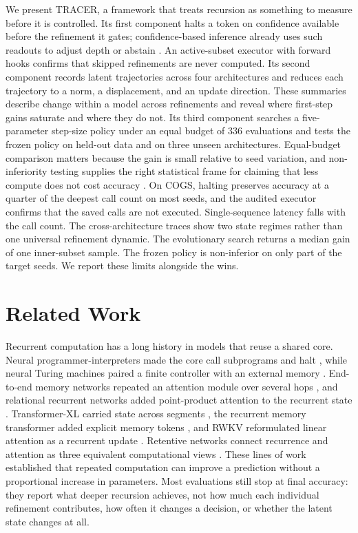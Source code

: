 \documentclass[11pt]{article}
\begin{document}
We present TRACER, a framework that treats recursion as something to measure before it is controlled. Its first component halts a token on confidence available before the refinement it gates; confidence-based inference already uses such readouts to adjust depth or abstain \citep{liu2020fastbert,xin2020deebert,geifman2017selective}. An active-subset executor with forward hooks confirms that skipped refinements are never computed. Its second component records latent trajectories across four architectures and reduces each trajectory to a norm, a displacement, and an update direction. These summaries describe change within a model across refinements and reveal where first-step gains saturate and where they do not. Its third component searches a five-parameter step-size policy under an equal budget of 336 evaluations and tests the frozen policy on held-out data and on three unseen architectures. Equal-budget comparison matters because the gain is small relative to seed variation, and non-inferiority testing supplies the right statistical frame for claiming that less compute does not cost accuracy \citep{docampobayon2025noninferiority,gu2023evaluation}. On COGS, halting preserves accuracy at a quarter of the deepest call count on most seeds, and the audited executor confirms that the saved calls are not executed. Single-sequence latency falls with the call count. The cross-architecture traces show two state regimes rather than one universal refinement dynamic. The evolutionary search returns a median gain of one inner-subset sample. The frozen policy is non-inferior on only part of the target seeds. We report these limits alongside the wins.

\section{Related Work}
\label{sec:related}

Recurrent computation has a long history in models that reuse a shared core. Neural programmer-interpreters made the core call subprograms and halt \citep{reed2016programmer}, while neural Turing machines paired a finite controller with an external memory \citep{graves2014neural}. End-to-end memory networks repeated an attention module over several hops \citep{sukhbaatar2015memory}, and relational recurrent networks added point-product attention to the recurrent state \citep{santoro2018relational}. Transformer-XL carried state across segments \citep{dai2019transformerxl}, the recurrent memory transformer added explicit memory tokens \citep{bulatov2022recurrent}, and RWKV reformulated linear attention as a recurrent update \citep{peng2023rwkv}. Retentive networks connect recurrence and attention as three equivalent computational views \citep{sun2023retentive}. These lines of work established that repeated computation can improve a prediction without a proportional increase in parameters. Most evaluations still stop at final accuracy: they report what deeper recursion achieves, not how much each individual refinement contributes, how often it changes a decision, or whether the latent state changes at all.
\end{document}
